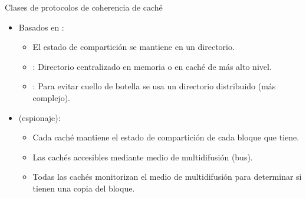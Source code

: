 \begin{frame}[t]{Clases de protocolos de coherencia de caché}
\begin{itemize}
  \item Basados en :
    \begin{itemize}
      \item El estado de compartición se mantiene en un directorio.
      \item {}: Directorio centralizado en memoria o en caché de más alto nivel.
      \item {}: Para evitar cuello de botella se usa un directorio distribuido (más complejo).
    \end{itemize}

  \item {} (espionaje):
    \begin{itemize}
      \item Cada caché mantiene el estado de compartición de cada bloque que tiene.
      \item Las cachés accesibles mediante medio de multidifusión (bus).
      \item Todas las cachés monitorizan el medio de multidifusión para determinar si tienen una copia del bloque.
    \end{itemize}
\end{itemize}
\end{frame}
